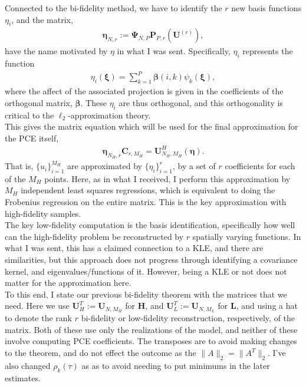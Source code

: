 \documentclass{report}
\begin{document}
Connected to the bi-fidelity method, we have to identify the $r$ new basis functions $\eta_i$, and the matrix,
\begin{align}
\label{eq:eta_def}
\bm{\eta}_{N,r} := \bm{\Psi}_{N,P}\bm{P}_{P,r}(\bm{U}^{(r)}),
\end{align}
have the name motivated by $\eta$ in what I was sent. Specifically, $\eta_i$ represents the function
\begin{align}
\label{eq:eta_function_def}
\eta_{i}(\bm{\xi}) = \mathop{\sum}\limits_{k=1}^P\bm{\beta}(i,k)\psi_{k}(\bm{\xi}),
\end{align}
where the affect of the associated projection is given in the coefficients of the orthogonal matrix, $\bm{\beta}$. These $\eta_i$ are thus orthogonal, and this orthogonality is critical to the $\ell_2$-approximation theory.\\

This gives the matrix equation which will be used for the final approximation for the PCE itself,
\begin{align}
\label{eq:mat_final}
\bm{\eta}_{N_H,r}\bm{C}_{r,M_H} = \bm{U}^{H}_{N_H,M_H}(\bm{\eta}).
\end{align}
That is, $\{u_i\}_{i=1}^{M_H}$ are approximated by $\{\eta_i\}_{i=1}^r$, by a set of $r$ coefficients for each of the $M_H$ points. Here, as in what I received, I perform this approximation by $M_H$ independent least squares regressions, which is equivalent to doing the Frobenius regression on the entire matrix. This is the key approximation with high-fidelity samples.\\

The key low-fidelity computation is the basis identification, specifically how well can the high-fidelity problem be reconstructed by $r$ spatially varying functions. In what I was sent, this has a claimed connection to a KLE, and there are similarities, but this approach does not progress through identifying a covariance kernel, and eigenvalues/functions of it. However, being a KLE or not does not matter for the approximation here.\\

To this end, I state our previous bi-fidelity theorem with the matrices that we need. Here we use $\bm{U}^T_H := \bm{U}_{N,M_H}$ for $\bm{H}$, and $\bm{U}^T_L :=\bm{U}_{N,M_L} $ for $\bm{L}$, and using a hat to denote the rank $r$ bi-fidelity or low-fidelity reconstruction, respectively, of the matrix. Both of these use only the realizations of the model, and neither of these involve computing PCE coefficients. The transposes are to avoid making changes to the theorem, and do not effect the outcome as the $\|A\|_2 = \|A^T\|_2$. I've also changed $\rho_k(\tau)$ as as to avoid needing to put minimums in the later estimates.
\end{document}

